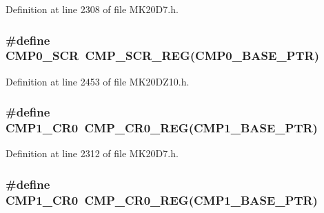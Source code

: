 Definition at line 2308 of file M\+K20\+D7.\+h.

\subsubsection[{\texorpdfstring{C\+M\+P0\+\_\+\+S\+CR}{CMP0_SCR}}]{\setlength{\rightskip}{0pt plus 5cm}\#define C\+M\+P0\+\_\+\+S\+CR~{\bf C\+M\+P\+\_\+\+S\+C\+R\+\_\+\+R\+EG}({\bf C\+M\+P0\+\_\+\+B\+A\+S\+E\+\_\+\+P\+TR})}\hypertarget{group___c_m_p___register___accessor___macros_ga4b5f2afaed69d7a475c7b49e6072c2d1}{}\label{group___c_m_p___register___accessor___macros_ga4b5f2afaed69d7a475c7b49e6072c2d1}


Definition at line 2453 of file M\+K20\+D\+Z10.\+h.

\subsubsection[{\texorpdfstring{C\+M\+P1\+\_\+\+C\+R0}{CMP1_CR0}}]{\setlength{\rightskip}{0pt plus 5cm}\#define C\+M\+P1\+\_\+\+C\+R0~{\bf C\+M\+P\+\_\+\+C\+R0\+\_\+\+R\+EG}({\bf C\+M\+P1\+\_\+\+B\+A\+S\+E\+\_\+\+P\+TR})}\hypertarget{group___c_m_p___register___accessor___macros_gaa82475a4569fb842d73f762929acfa98}{}\label{group___c_m_p___register___accessor___macros_gaa82475a4569fb842d73f762929acfa98}


Definition at line 2312 of file M\+K20\+D7.\+h.

\subsubsection[{\texorpdfstring{C\+M\+P1\+\_\+\+C\+R0}{CMP1_CR0}}]{\setlength{\rightskip}{0pt plus 5cm}\#define C\+M\+P1\+\_\+\+C\+R0~{\bf C\+M\+P\+\_\+\+C\+R0\+\_\+\+R\+EG}({\bf C\+M\+P1\+\_\+\+B\+A\+S\+E\+\_\+\+P\+TR})}\hypertarget{group___c_m_p___register___accessor___macros_gaa82475a4569fb842d73f762929acfa98}{}\label{group___c_m_p___register___accessor___macros_gaa82475a4569fb842d73f762929acfa98}


